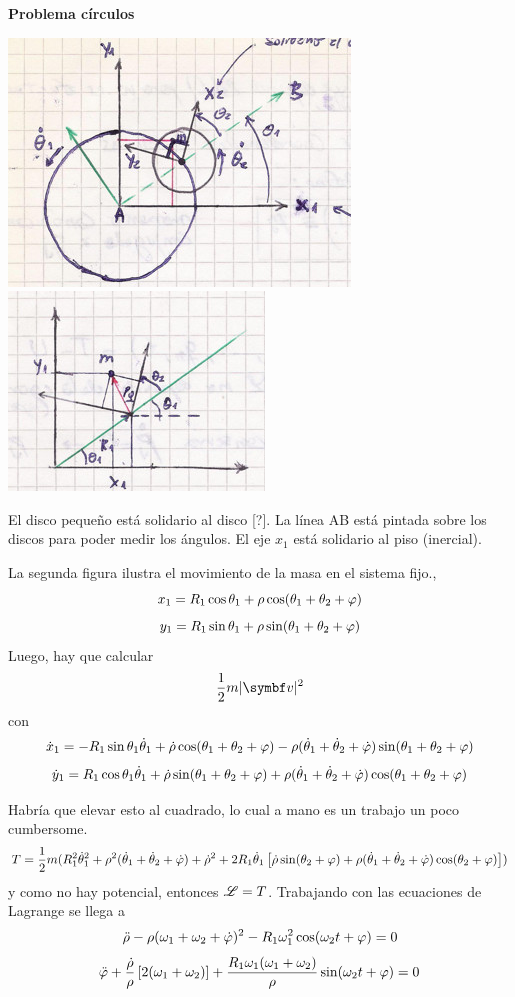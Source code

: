 \documentclass[10pt,oneside]{CBFT_book}
\begin{document}
\begin{ejemplo}{\bf Problema círculos}

\includegraphics[scale=0.3]{images/fig_mc_dos_circulos_rotantes.jpg} 
\includegraphics[scale=0.3]{images/fig_mc_dos_circulos_subsistema.jpg} 
 
El disco pequeño está solidario al disco [?]. La línea AB está pintada sobre los discos para poder medir los ángulos.
El eje $x_1$ está solidario al piso (inercial).

La segunda figura ilustra el movimiento de la masa en el sistema fijo.,
\[
	x_1 = R_1 \cos \theta_1 + \rho \cos ( \theta_1 + \theta_2 + \varphi )
\]
\[
	y_1 = R_1 \sin \theta_1 + \rho \sin ( \theta_1 + \theta_2 + \varphi )
\]
Luego, hay que calcular 
\[
	\frac 1 2 m |\vb{v}|^2
\]
con 
\[
	\dot{x}_1 = -R_1 \sin \theta_1 \dot{\theta}_1 + \dot{\rho} \cos ( \theta_1 + \theta_2 + \varphi ) -
	\rho ( \dot{\theta}_1 + \dot{\theta}_2 + \dot{\varphi} ) \sin( \theta_1 + \theta_2 + \varphi )
\]
\[
	\dot{y}_1 = R_1 \cos \theta_1 \dot{\theta}_1 + \dot{\rho} \sin ( \theta_1 + \theta_2 + \varphi ) +
	\rho ( \dot{\theta}_1 + \dot{\theta}_2 + \dot{\varphi} ) \cos( \theta_1 + \theta_2 + \varphi )	
\]

Habría que elevar esto al cuadrado, lo cual a mano es un trabajo un poco cumbersome.
\[
	T = \frac 1 2 m ( R_1^2 \dot{\theta}_1^2 + \rho^2( \dot{\theta}_1 + \dot{\theta}_2  + \dot{\varphi} ) + \dot{\rho}^2 + 
	2R_1\dot{\theta}_1\left[ \dot{\rho}\sin(\theta_2+\varphi) + \rho( \dot{\theta}_1 + \dot{\theta}_2 + \dot{\varphi} )\cos(\theta_2+\varphi) \right])
\]
y como no hay potencial, entonces $\mathscr{L} = T $. Trabajando con las ecuaciones de Lagrange se llega a
\[
	\ddot{\rho} - \rho ( \omega_1 + \omega_2 + \dot{\varphi} )^2 - R_1 \omega_1^2 \cos (\omega_2 t + \varphi ) = 0
\]
\[
	\ddot{\varphi} + \frac{\dot{\rho}}{\rho}\left[ 2(\omega_1 + \omega_2 )\right] + 
	\frac{R_1\omega_1( \omega_1 + \omega_2 )}{\rho} \sin (\omega_2 t + \varphi ) = 0
\]


\end{ejemplo}
\end{document}
